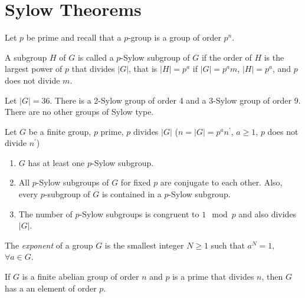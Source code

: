 \documentclass{article}
\begin{document}
\section{Sylow Theorems}
Let $p$ be prime and recall that a $p$-group is a group of order
$p^n$.

\begin{defn}
A subgroup $H$ of $G$ is called a $p$-Sylow subgroup of $G$ if the
order of $H$ is the largest power of $p$ that divides $|G|$, that is
$|H| = p^a$ if $|G| = p^a m$, $|H| = p^a$, and $p$ does not divide $m$.
\end{defn}

\begin{xmpl}
Let $|G| = 36$. There is a 2-Sylow group of order 4 and a 3-Sylow
group of order 9. There are no other groups of Sylow type.
\end{xmpl}

\begin{theorem}
  Let $G$ be a finite group, $p$ prime, $p$ divides $|G|$
  ($n = |G| = p^a n^\prime$, $a \geq 1$, $p$ does not divide $n^\prime$)
  \begin{enumerate}
    \item{$G$ has at least one $p$-Sylow subgroup.
         }
    \item{All $p$-Sylow subgroups of $G$ for fixed $p$ are conjugate
          to each other. Also, every $p$-subgroup of $G$ is contained
          in a $p$-Sylow subgroup. 
         }
    \item{The number of $p$-Sylow subgroups is congruent to $1 \mod p$
          and also divides $|G|$.
         }
  \end{enumerate}
\end{theorem}

\begin{defn}
The \emph{exponent} of a group $G$ is the smallest integer $N \geq 1$
such that $a^N = 1,$ $\forall a \in G$.
\end{defn}

\begin{lemma}
If $G$ is a finite abelian group of order $n$ and $p$ is a prime that
divides $n$, then $G$ has a an element of order $p$.
\end{lemma}
\end{document}
